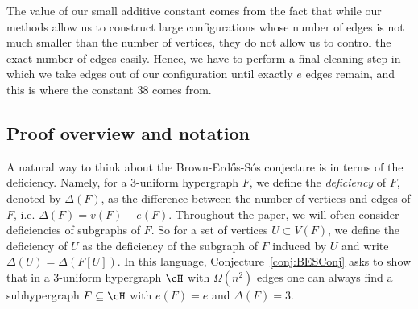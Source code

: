 The value of our small additive constant comes from the fact that while our methods allow us to construct large configurations whose number of edges is not much smaller than the number of vertices, they do not allow us to control the exact number of edges easily. Hence, we have to perform a final cleaning step in which we take edges out of our configuration until exactly $e$ edges remain, and this is where the constant $38$ comes from. 

\subsection{Proof overview and notation}

A natural way to think about the Brown-Erd\H{o}s-S\'os conjecture is in terms of the deficiency. Namely, for a 3-uniform hypergraph $F$, we define the \textit{deficiency} of $F$, denoted by $\Delta(F)$, as the difference between the number of vertices and edges of $F$, i.e. $\Delta(F)=v(F)-e(F)$. Throughout the paper, we will often consider deficiencies of subgraphs of $F$. So for a set of vertices $U\subset V(F)$, we define the deficiency of $U$ as the deficiency of the subgraph of $F$ induced by $U$ and write $\Delta(U)=\Delta(F[U])$. In this language, Conjecture~\ref{conj:BESConj} asks to show that in a 3-uniform hypergraph $\cH$ with $\Omega(n^2)$ edges one can always find a subhypergraph $F\subseteq \cH$ with $e(F)=e$ and $\Delta(F)=3$.

